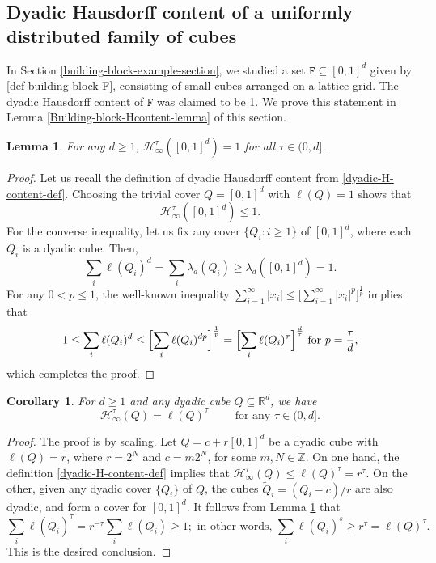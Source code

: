 \documentclass[a4paper,11pt]{amsart}
\newtheorem{cor}[thm]{\bf Corollary}
\newtheorem{lem}[thm]{\bf Lemma}
\numberwithin{equation}{section}
\begin{document}
\subsection{Dyadic Hausdorff content of a uniformly distributed family of cubes} \label{Building-block-Hcontent-section}
In Section \ref{building-block-example-section}, we studied a set $\mathtt F \subseteq [0,1]^d$ given by \eqref{def-building-block-F}, consisting of small cubes arranged on a lattice grid. The dyadic Hausdorff content of $\mathtt F$ was claimed to be 1. We prove this statement in Lemma \ref{Building-block-Hcontent-lemma} of this section. 
\begin{lem} \label{cube-Hcontent-lemma}
For any $d \geq 1$, $\mathcal H_{\infty}^{\tau}([0,1]^d) = 1$ for all $\tau \in (0, d]$. 
\end{lem} 
\begin{proof} 
Let us recall the definition of dyadic Hausdorff content from \eqref{dyadic-H-content-def}. Choosing the trivial cover $Q = [0,1]^d$ with $\ell(Q) = 1$ shows that 
\[ \mathcal H_{\infty}^{\tau}([0,1]^d) \leq 1.  \]
For the converse inequality, let us fix any cover $\{Q_i: i \geq 1\}$ of $[0,1]^d$, where each $Q_i$ is a dyadic cube. Then,
\[ \sum_{i} \ell(Q_i)^d = \sum_i \lambda_d(Q_i) \geq \lambda_d([0,1]^d) = 1. \]
For any $0 < p \leq 1$, the well-known inequality $\sum_{i=1}^{\infty} |x_i| \leq \bigl[\sum_{i=1}^{\infty} |x_i|^p \bigr]^{\frac{1}{p}}$ implies that 
\[ 1 \leq \sum_{i} \ell(Q_i)^d \leq \Bigl[ \sum_{i} \ell(Q_i)^{dp} \Bigr]^{\frac1p} = \Bigl[ \sum_{i} \ell(Q_i)^{\tau} \Bigr]^{\frac{d}{\tau}} \text{ for } p = \frac{\tau}{d},  \]   
which completes the proof. 
\end{proof} 
\begin{cor}\label{dyadic-cube-Hcontent-corollary}
For $d \geq 1$ and any dyadic cube $Q \subseteq \mathbb R^d$, we have 
\[ \mathcal H_{\infty}^{\tau}(Q) = \ell(Q)^{\tau} \qquad \text{ for any } \tau \in (0, d]. \] 
\end{cor} 
\begin{proof} 
The proof is by scaling. Let $Q = c + r[0,1]^d$ be a dyadic cube with $\ell(Q) = r$, where $r = 2^N$ and $c = m2^N$, for some $m, N \in \mathbb Z$. On one hand, the definition \eqref{dyadic-H-content-def} implies that $\mathcal H_{\infty}^{\tau}(Q) \leq \ell(Q)^{\tau} = r^{\tau}$. On the other, given any dyadic cover $\{Q_i\}$ of $Q$, the cubes $\tilde{Q}_i = (Q_i-c)/r$ are also dyadic, and form a cover for $[0,1]^d$. It follows from Lemma \ref{cube-Hcontent-lemma} that 
\[ \sum_i \ell(\tilde{Q}_i)^{\tau} = r^{-\tau} \sum_i \ell(Q_i)\geq 1; \text{ in other words, } \sum_i \ell(Q_i)^s \geq r^{\tau} = \ell(Q)^{\tau}. \]  
This is the desired conclusion. 
\end{proof} 
\end{document}
